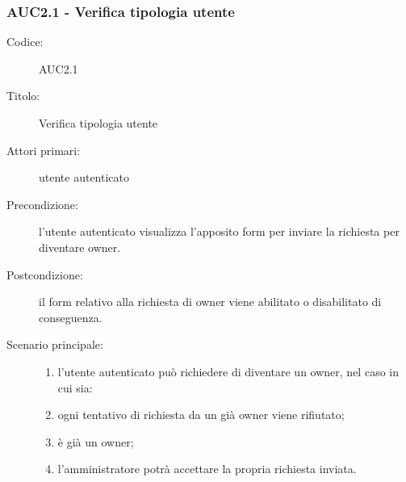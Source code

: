 \documentclass[casi-duso]{subfiles}
\begin{document}
\subsubsection{AUC2.1 - Verifica tipologia utente}%
\label{subsub:AUC2.1}
\begin{description}
  \item[Codice:] AUC2.1
  \item[Titolo:] Verifica tipologia utente
  \item[Attori primari:] utente autenticato
  \item[Precondizione:] l'utente autenticato visualizza l'apposito form per inviare la richiesta per diventare owner.
  \item[Postcondizione:] il form relativo alla richiesta di owner viene abilitato o disabilitato di conseguenza.
  \item[Scenario principale:]
  \begin{enumerate}
    \item l'utente autenticato può richiedere di diventare un owner, nel caso in cui sia:
    \item ogni tentativo di richiesta da un già owner viene rifiutato;
    \item {} è già un owner;
    \item l'amministratore potrà accettare la propria richiesta inviata.
  \end{enumerate}
\end{description}
\end{document}
